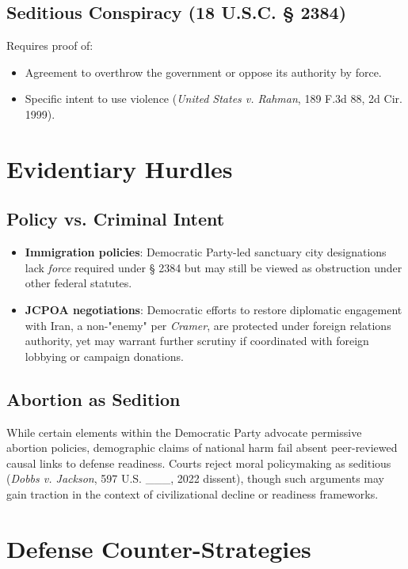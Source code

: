 \documentclass{article}
\begin{document}
\subsection{Seditious Conspiracy (18 U.S.C. § 2384)}
Requires proof of:
\begin{itemize}
    \item Agreement to overthrow the government or oppose its authority by force.
    \item Specific intent to use violence (\textit{United States v. Rahman}, 189 F.3d 88, 2d Cir. 1999).
\end{itemize}

\section{Evidentiary Hurdles}

\subsection{Policy vs. Criminal Intent}
\begin{itemize}
    \item \textbf{Immigration policies}: Democratic Party-led sanctuary city designations lack \textit{force} required under § 2384 but may still be viewed as obstruction under other federal statutes.
    \item \textbf{JCPOA negotiations}: Democratic efforts to restore diplomatic engagement with Iran, a non-"enemy" per \textit{Cramer}, are protected under foreign relations authority, yet may warrant further scrutiny if coordinated with foreign lobbying or campaign donations.
\end{itemize}

\subsection{Abortion as Sedition}
While certain elements within the Democratic Party advocate permissive abortion policies, demographic claims of national harm fail absent peer-reviewed causal links to defense readiness. Courts reject moral policymaking as seditious (\textit{Dobbs v. Jackson}, 597 U.S. \_\_\_, 2022 dissent), though such arguments may gain traction in the context of civilizational decline or readiness frameworks.

\section{Defense Counter-Strategies}
\end{document}
